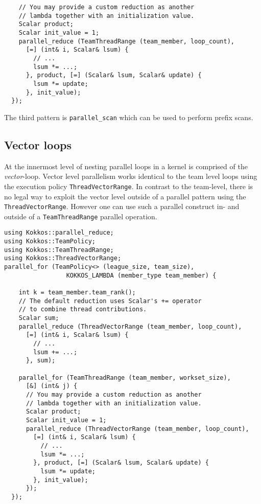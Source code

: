 \begin{enumerate}
\begin{lstlisting}
    // You may provide a custom reduction as another
    // lambda together with an initialization value.
    Scalar product;
    Scalar init_value = 1;
    parallel_reduce (TeamThreadRange (team_member, loop_count), 
      [=] (int& i, Scalar& lsum) {
        // ...
        lsum *= ...;
      }, product, [=] (Scalar& lsum, Scalar& update) {
        lsum *= update; 
      }, init_value);
  });
\end{lstlisting}

The third pattern is \lstinline|parallel_scan| which can be used to perform prefix scans.

\subsection{Vector loops}\label{SS:Hierarchical:Nested:Loops:Vector}

At the innermost level of nesting parallel loops in a kernel is comprised of the \emph{vector}-loop.
Vector level parallelism works identical to the team level loops using the execution policy \lstinline|ThreadVectorRange|.
In contrast to the team-level, there is no legal way to exploit the vector level outside of a parallel pattern using the \lstinline|ThreadVectorRange|. 
However one can use such a parallel construct in- and outside of a \lstinline|TeamThreadRange| parallel operation. 

\begin{lstlisting}
using Kokkos::parallel_reduce;
using Kokkos::TeamPolicy;
using Kokkos::TeamThreadRange;
using Kokkos::ThreadVectorRange;
parallel_for (TeamPolicy<> (league_size, team_size),
                 KOKKOS_LAMBDA (member_type team_member) {

    int k = team_member.team_rank();
    // The default reduction uses Scalar's += operator
    // to combine thread contributions.
    Scalar sum;
    parallel_reduce (ThreadVectorRange (team_member, loop_count),
      [=] (int& i, Scalar& lsum) {
        // ...
        lsum += ...;
      }, sum);

    parallel_for (TeamThreadRange (team_member, workset_size),
      [&] (int& j) {
      // You may provide a custom reduction as another
      // lambda together with an initialization value.
      Scalar product;
      Scalar init_value = 1;
      parallel_reduce (ThreadVectorRange (team_member, loop_count),
        [=] (int& i, Scalar& lsum) {
          // ...
          lsum *= ...;
        }, product, [=] (Scalar& lsum, Scalar& update) {
          lsum *= update;
        }, init_value);
      });
  });
\end{lstlisting}  


\end{enumerate}
